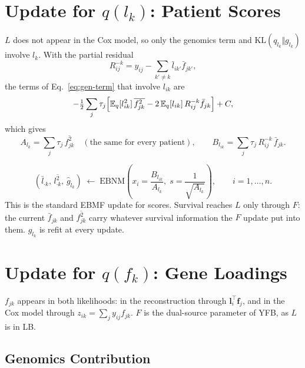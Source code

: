 \documentclass[11pt]{article}
\newcommand{\lbar}[2]{\bar{l}_{#1#2}}
\newcommand{\fbar}[2]{\bar{f}_{#1#2}}
\newcommand{\lsec}[2]{\overline{l^2_{#1#2}}}
\newcommand{\fsec}[2]{\overline{f^2_{#1#2}}}
\newcommand{\E}{\mathbb{E}_q}
\newcommand{\KL}{\mathrm{KL}}
\begin{document}
\section{Update for $q(l_k)$: Patient Scores}\label{sec:L}

$L$ does not appear in the Cox model, so only the genomics term and
$\KL(q_{l_k}\Vert g_{l_k})$ involve $l_k$. With the partial residual
\begin{equation}\label{eq:Rk}
  R^{-k}_{ij} = y_{ij} - \sum_{k'\ne k}\lbar{i}{k'}\fbar{j}{k'},
\end{equation}
the terms of Eq.~\eqref{eq:gen-term} that involve $l_{ik}$ are
\[
  -\tfrac12\sum_j\tau_j\Bigl[\E[l_{ik}^2]\,\fsec{j}{k}
     - 2\,\E[l_{ik}]\,R^{-k}_{ij}\fbar{j}{k}\Bigr] + C,
\]
which gives
\begin{equation}\label{eq:AB-L}
  A_{l_k} = \sum_j \tau_j\,\fsec{j}{k}\quad(\text{the same for every patient}), \qquad
  B_{l_{ik}} = \sum_j \tau_j\,R^{-k}_{ij}\,\fbar{j}{k}.
\end{equation}

\begin{ebnmbox}
\[
  (\lbar{\cdot}{k},\,\lsec{\cdot}{k},\,\hat g_{l_k})
  \;\leftarrow\; \mathrm{EBNM}\!\left(x_i = \frac{B_{l_{ik}}}{A_{l_k}},\;
  s = \frac{1}{\sqrt{A_{l_k}}}\right), \qquad i = 1,\ldots,n .
\]
This is the standard EBMF update for scores. Survival reaches $L$ only through
$F$: the current $\fbar{j}{k}$ and $\fsec{j}{k}$ carry whatever survival
information the $F$ update put into them. $g_{l_k}$ is refit at every update.
\end{ebnmbox}

\section{Update for $q(f_k)$: Gene Loadings}\label{sec:F}

$f_{jk}$ appears in both likelihoods: in the reconstruction through
$\bm l_i^\top\bm f_j$, and in the Cox model through $z_{ik} = \sum_j y_{ij}f_{jk}$.
$F$ is the dual-source parameter of YFB, as $L$ is in LB.

\subsection{Genomics Contribution}
\end{document}
